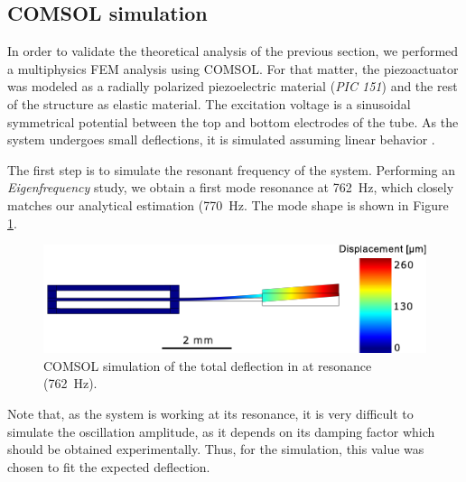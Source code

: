 \subsection*{COMSOL simulation}
In order to validate the theoretical analysis of the previous section, we performed a multiphysics FEM analysis using COMSOL. For that matter, the piezoactuator was modeled as a radially polarized piezoelectric material (\textit{PIC 151}) and the rest of the structure as elastic material. The excitation voltage is a sinusoidal symmetrical potential between the top and bottom electrodes of the tube. As the system undergoes small deflections, it is simulated assuming linear behavior \cite{Fertis2006}.

The first step is to simulate the resonant frequency of the system. Performing an \textit{Eigenfrequency} study, we obtain a first mode resonance at \SI{762}{\hertz}, which closely matches our analytical estimation (\SI{770}{\hertz}. The mode shape is shown in Figure \ref{fig:defle}.

\begin{figure}[h!]\centering
      \includegraphics[width=10 cm]{figures/30_DesignSimulation/Mechanical/deflection.pdf}
      \caption{COMSOL simulation of the total deflection in at resonance (\SI{762}{\hertz}).}
      \label{fig:defle}
\end{figure}

Note that, as the system is working at its resonance, it is very difficult to simulate the oscillation amplitude, as it depends on its damping factor which should be obtained experimentally. Thus, for the simulation, this value was chosen to fit the expected deflection. 

